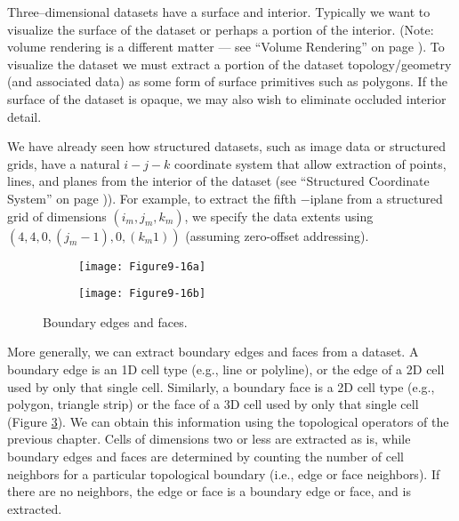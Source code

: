 Three--dimensional datasets have a surface and interior. Typically we want to visualize the surface of the dataset or perhaps a portion of the interior. (Note: volume rendering is a different matter --- see ``Volume Rendering'' on page \pageref{sec:volume_rendering}). To visualize the dataset we must extract a portion of the dataset topology/geometry (and associated data) as some form of surface primitives such as polygons. If the surface of the dataset is opaque, we may also wish to eliminate occluded interior detail.

We have already seen how structured datasets, such as image data or structured grids, have a natural $i-j-k$ coordinate system that allow extraction of points, lines, and planes from the interior of the dataset (see ``Structured Coordinate System'' on page \pageref{subsec:structured_coordinate_system})). For example, to extract the fifth $-$iplane from a structured grid of dimensions $(i_m, j_m, k_m)$, we specify the data extents using $(4, 4, 0, (j_m - 1), 0, (k_m 1))$ (assuming zero-offset addressing).

\begin{figure}[htb]
	\begin{subfigure}[h]{0.48\linewidth}
		\texttt{[image: Figure9-16a]}
		\captionsetup{justification=centering}
		\caption*{}
		\label{fig:Figure9-16a}
	\end{subfigure}
	\hfill
	\begin{subfigure}[h]{0.48\linewidth}
		\texttt{[image: Figure9-16b]}
		\captionsetup{justification=centering}
		\caption*{}
		\label{fig:Figure9-16b}
	\end{subfigure}
	\caption{Boundary edges and faces.}\label{fig:Figure9-16}
\end{figure}

More generally, we can extract boundary edges and faces from a dataset. A boundary edge is an 1D cell type (e.g., line or polyline), or the edge of a 2D cell used by only that single cell. Similarly, a boundary face is a 2D cell type (e.g., polygon, triangle strip) or the face of a 3D cell used by only that single cell (Figure \ref{fig:Figure9-16}). We can obtain this information using the topological operators of the previous chapter. Cells of dimensions two or less are extracted as is, while boundary edges and faces are determined by counting the number of cell neighbors for a particular topological boundary (i.e., edge or face neighbors). If there are no neighbors, the edge or face is a boundary edge or face, and is extracted.

